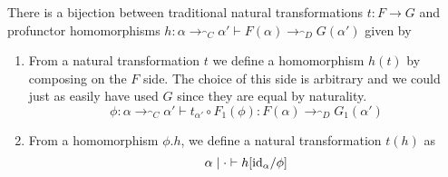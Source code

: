 \documentclass{article}
\begin{document}
\begin{theorem}
  There is a bijection between traditional natural transformations $t
  : F \to G$ and profunctor homomorphisms $h : \alpha \to_{\cat C}
  \alpha' \vdash F(\alpha) \to_{\cat D} G(\alpha')$ given by
  \begin{enumerate}
  \item From a natural transformation $t$ we define a homomorphism
    $h(t)$ by composing on the $F$ side. The choice of this side is
    arbitrary and we could just as easily have used $G$ since they are
    equal by naturality.
    \[ \phi : \alpha \to_{\cat C} \alpha' \vdash t_{\alpha'} \circ F_1(\phi) : F(\alpha) \to_{\cat D} G_1(\alpha') \]
  \item From a homomorphism $\phi.h$, we define a natural transformation $t(h)$ as
    \[ \alpha \mathrel{|} \cdot \vdash h[{\textrm{id}_{\alpha}}/\phi] \]
  \end{enumerate}
\end{theorem}
\end{document}
